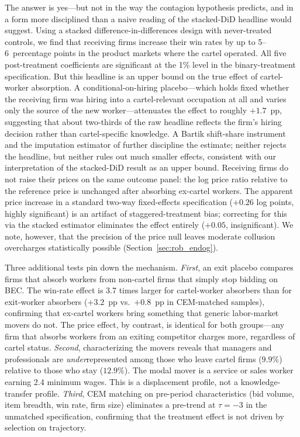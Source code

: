 The answer is yes---but not in the way the contagion hypothesis predicts, and in a form more disciplined than a naive reading of the stacked-DiD headline would suggest. Using a stacked difference-in-differences design with never-treated controls, we find that receiving firms increase their win rates by up to 5--6~percentage points in the product markets where the cartel operated. All five post-treatment coefficients are significant at the 1\% level in the binary-treatment specification. But this headline is an upper bound on the true effect of cartel-worker absorption. A conditional-on-hiring placebo---which holds fixed whether the receiving firm was hiring into a cartel-relevant occupation at all and varies only the source of the new worker---attenuates the effect to roughly $+1.7$~pp, suggesting that about two-thirds of the raw headline reflects the firm's hiring decision rather than cartel-specific knowledge. A Bartik shift-share instrument and the imputation estimator of \citet{borusyak2024revisiting} further discipline the estimate; neither rejects the headline, but neither rules out much smaller effects, consistent with our interpretation of the stacked-DiD result as an upper bound. Receiving firms do not raise their prices on the same outcome panel: the log price ratio relative to the reference price is unchanged after absorbing ex-cartel workers. The apparent price increase in a standard two-way fixed-effects specification ($+0.26$ log points, highly significant) is an artifact of staggered-treatment bias; correcting for this via the stacked estimator eliminates the effect entirely ($+0.05$, insignificant). We note, however, that the precision of the price null leaves moderate collusion overcharges statistically possible (Section~\ref{sec:rob_endog}).

Three additional tests pin down the mechanism. \emph{First}, an exit placebo compares firms that absorb workers from non-cartel firms that simply stop bidding on BEC. The win-rate effect is 3.7 times larger for cartel-worker absorbers than for exit-worker absorbers ($+3.2$~pp vs.\ $+0.8$~pp in CEM-matched samples), confirming that ex-cartel workers bring something that generic labor-market movers do not. The price effect, by contrast, is identical for both groups---any firm that absorbs workers from an exiting competitor charges more, regardless of cartel status. \emph{Second}, characterizing the movers reveals that managers and professionals are \emph{under}represented among those who leave cartel firms ($9.9\%$) relative to those who stay ($12.9\%$). The modal mover is a service or sales worker earning 2.4 minimum wages. This is a displacement profile, not a knowledge-transfer profile. \emph{Third}, CEM matching on pre-period characteristics (bid volume, item breadth, win rate, firm size) eliminates a pre-trend at $\tau = -3$ in the unmatched specification, confirming that the treatment effect is not driven by selection on trajectory.

